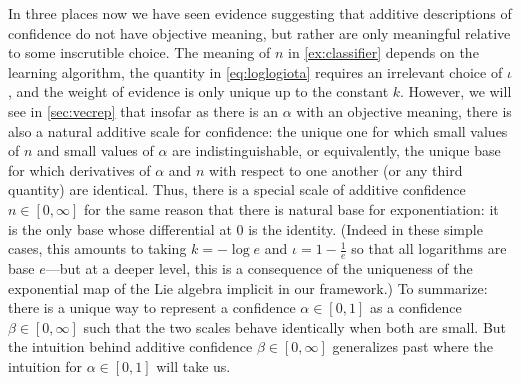 %
In three places now we have seen evidence suggesting that 
additive descriptions of confidence do not have objective meaning,
but rather are only meaningful relative to some inscrutible choice.
The meaning of $n$ in \cref{ex:classifier} depends on the learning algorithm,
the quantity in \eqref{eq:loglogiota} requires an irrelevant choice of $\iota$,
and the weight of evidence is only unique up to the constant $k$.
However, we will see in \cref{sec:vecrep} that insofar as there is an 
$\alpha$ with an objective meaning, there is also a natural additive 
scale for confidence: the unique one for which small values of $n$ and 
small values of $\alpha$ are indistinguishable, or equivalently,
the unique base for which derivatives of $\alpha$ and $n$ with respect
to one another (or any third quantity) are identical.
Thus, there is a special scale of additive confidence $n \in [0,\infty]$
for the same reason that there is natural base for exponentiation: 
it is the only base whose differential at 0 is the identity. 
(Indeed in these simple cases, this amounts to taking $k = -\log e$ and $\iota = 1-\frac1e$ so that all logarithms are base $e$---but at a deeper level, this is a consequence of the uniqueness of the exponential map of the Lie algebra implicit in our framework.)
To summarize: there is a unique way to represent a confidence
$\alpha \in [0,1]$ as a confidence $\beta \in [0, \infty]$
such that the two scales behave identically when both are small. 
But the intuition behind additive confidence $\beta \in [0, \infty]$ 
generalizes past where the intuition for $\alpha \in [0,1]$ will take us.


